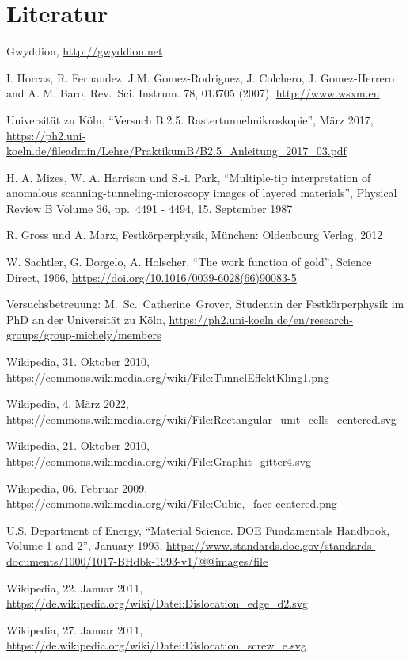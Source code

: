 \documentclass[12pt,a4paper]{scrartcl}
\numberwithin{equation}{section} %
\begin{document}
\clearpage
\hypertarget{literatur}{%
\section{Literatur}\label{literatur}}
\begin{thebibliography}{9}
	Gwyddion, \url{http://gwyddion.net}

	I. Horcas, R. Fernandez, J.M. Gomez-Rodriguez, J. Colchero, J. Gomez-Herrero and A. M. Baro, Rev.~Sci. Instrum. 78, 013705 (2007), \url{http://www.wsxm.eu}

	Universität zu Köln, ``Versuch B.2.5. Rastertunnelmikroskopie'', März 2017, 	\url{https://ph2.uni-koeln.de/fileadmin/Lehre/PraktikumB/B2.5_Anleitung_2017_03.pdf}

	H. A. Mizes, W. A. Harrison und S.-i. Park, ``Multiple-tip interpretation of anomalous scanning-tunneling-microscopy images of layered materials'', Physical Review B Volume 36, pp.~4491 - 4494, 15. September 1987

	R. Gross und A. Marx, Festkörperphysik, München: Oldenbourg Verlag, 2012

	W. Sachtler, G. Dorgelo, A. Holscher, ``The work function of gold'', Science Direct, 1966,
	\url{https://doi.org/10.1016/0039-6028(66)90083-5}

	Versuchsbetreuung: M.~Sc.~Catherine~Grover, Studentin der Festkörperphysik im PhD an der Universität zu Köln, \url{https://ph2.uni-koeln.de/en/research-groups/group-michely/members}

	Wikipedia, 31. Oktober 2010, \url{https://commons.wikimedia.org/wiki/File:TunnelEffektKling1.png}

	Wikipedia, 4. März 2022, \url{https://commons.wikimedia.org/wiki/File:Rectangular_unit_cells_centered.svg}

	Wikipedia, 21. Oktober 2010, \url{https://commons.wikimedia.org/wiki/File:Graphit_gitter4.svg}

	Wikipedia, 06. Februar 2009, \url{https://commons.wikimedia.org/wiki/File:Cubic,_face-centered.png}

	U.S. Department of Energy, ``Material Science. DOE Fundamentals Handbook, Volume 1 and 2'', January 1993, \url{https://www.standards.doe.gov/standards-documents/1000/1017-BHdbk-1993-v1/@@images/file}

	Wikipedia, 22. Januar 2011, \url{https://de.wikipedia.org/wiki/Datei:Dislocation_edge_d2.svg}

	Wikipedia, 27. Januar 2011, \url{https://de.wikipedia.org/wiki/Datei:Dislocation_screw_e.svg}

\end{thebibliography}
\end{document}
